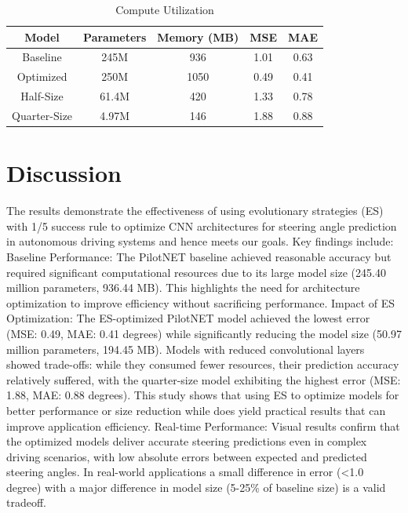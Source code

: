 \documentclass[conference]{IEEEtran}
\begin{document}
\begin{table}[ht!]
    \centering
    \caption{Compute Utilization}
    \begin{tabular}{c|c|c|c|c}

        \textbf{Model} & \textbf{Parameters} & \textbf{Memory (MB)} & \textbf{MSE} & \textbf{MAE} \\
        \hline
        Baseline       & 245M                & 936                  & 1.01         & 0.63         \\
        Optimized      & 250M                & 1050                 & 0.49         & 0.41         \\
        Half-Size      & 61.4M               & 420                  & 1.33         & 0.78         \\
        Quarter-Size   & 4.97M               & 146                  & 1.88         & 0.88         \\
    \end{tabular}
    \label{tab:compute}
\end{table}

\section{Discussion}
The results demonstrate the effectiveness of using evolutionary strategies (ES) with 1/5 success rule to optimize CNN architectures for steering angle prediction in autonomous driving systems and hence meets our goals. Key findings include:
Baseline Performance: The PilotNET baseline achieved reasonable accuracy but required significant computational resources due to its large model size (245.40 million parameters, 936.44 MB).
This highlights the need for architecture optimization to improve efficiency without sacrificing performance.
Impact of ES Optimization: The ES-optimized PilotNET model achieved the lowest error (MSE: 0.49, MAE: 0.41 degrees) while significantly reducing the model size (50.97 million parameters, 194.45 MB). Models with reduced convolutional layers showed trade-offs: while they consumed fewer resources, their prediction accuracy relatively suffered, with the quarter-size model exhibiting the highest error (MSE: 1.88, MAE: 0.88 degrees). This study shows that using ES to optimize models for better performance or size reduction while does yield practical results that can improve application efficiency.
Real-time Performance: Visual results confirm that the optimized models deliver accurate steering predictions even in complex driving scenarios, with low absolute errors between expected and predicted steering angles. In real-world applications a small difference in error (<1.0 degree) with a major difference in model size (5-25\% of baseline size) is a valid tradeoff.
\end{document}
